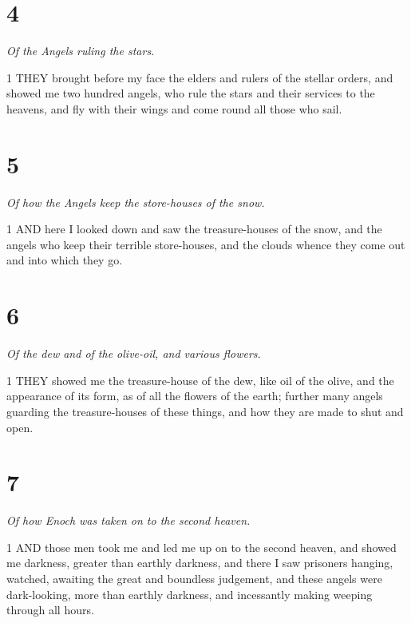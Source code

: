 \chapter{4}

\par \textit{Of the Angels ruling the stars.}

\par 1 THEY brought before my face the elders and rulers of the stellar orders, and showed me two hundred angels, who rule the stars and their services to the heavens, and fly with their wings and come round all those who sail.

\chapter{5}

\par \textit{Of how the Angels keep the store-houses of the snow.}

\par 1 AND here I looked down and saw the treasure-houses of the snow, and the angels who keep their terrible store-houses, and the clouds whence they come out and into which they go.

\chapter{6}

\par \textit{Of the dew and of the olive-oil, and various flowers.}

\par 1 THEY showed me the treasure-house of the dew, like oil of the olive, and the appearance of its form, as of all the flowers of the earth; further many angels guarding the treasure-houses of these things, and how they are made to shut and open.

\chapter{7}

\par \textit{Of how Enoch was taken on to the second heaven.}

\par 1 AND those men took me and led me up on to the second heaven, and showed me darkness, greater than earthly darkness, and there I saw prisoners hanging, watched, awaiting the great and boundless judgement, and these angels were dark-looking, more than earthly darkness, and incessantly making weeping through all hours.

